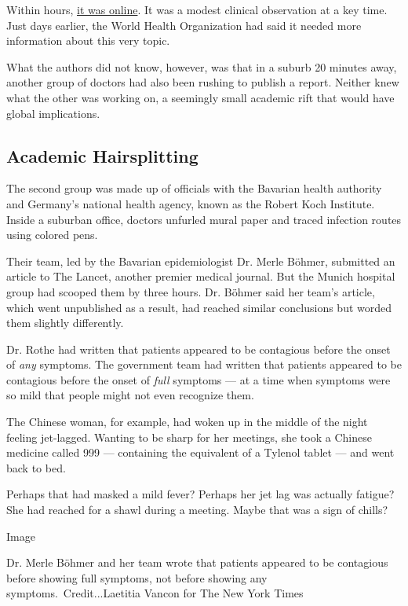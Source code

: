 Within hours,
\href{https://www.nejm.org/doi/full/10.1056/NEJMc2001468}{it was
online}. It was a modest clinical observation at a key time. Just days
earlier, the World Health Organization had said it needed more
information about this very topic.

What the authors did not know, however, was that in a suburb 20 minutes
away, another group of doctors had also been rushing to publish a
report. Neither knew what the other was working on, a seemingly small
academic rift that would have global implications.

\hypertarget{academic-hairsplitting}{%
\subsection{Academic Hairsplitting}\label{academic-hairsplitting}}

The second group was made up of officials with the Bavarian health
authority and Germany's national health agency, known as the Robert Koch
Institute. Inside a suburban office, doctors unfurled mural paper and
traced infection routes using colored pens.

Their team, led by the Bavarian epidemiologist Dr. Merle Böhmer,
submitted an article to The Lancet, another premier medical journal. But
the Munich hospital group had scooped them by three hours. Dr. Böhmer
said her team's article, which went unpublished as a result, had reached
similar conclusions but worded them slightly differently.

Dr. Rothe had written that patients appeared to be contagious before the
onset of \emph{any} symptoms. The government team had written that
patients appeared to be contagious before the onset of \emph{full}
symptoms --- at a time when symptoms were so mild that people might not
even recognize them.

The Chinese woman, for example, had woken up in the middle of the night
feeling jet-lagged. Wanting to be sharp for her meetings, she took a
Chinese medicine called 999 --- containing the equivalent of a Tylenol
tablet --- and went back to bed.

Perhaps that had masked a mild fever? Perhaps her jet lag was actually
fatigue? She had reached for a shawl during a meeting. Maybe that was a
sign of chills?

Image

Dr. Merle Böhmer and her team wrote that patients appeared to be
contagious before showing full symptoms, not before showing any
symptoms.~Credit...Laetitia Vancon for The New York Times

